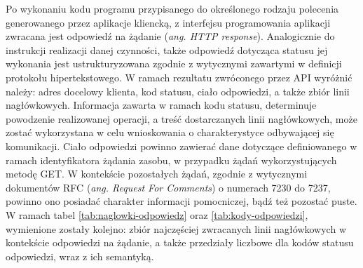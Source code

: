 Po wykonaniu kodu programu przypisanego do określonego rodzaju polecenia generowanego przez aplikacje kliencką, z interfejsu programowania aplikacji zwracana jest odpowiedź na żądanie (\textit{ang. HTTP response}). Analogicznie do instrukcji realizacji danej czynności, także odpowiedź dotycząca statusu jej wykonania jest ustrukturyzowana zgodnie z wytycznymi zawartymi w definicji protokołu hipertekstowego. W ramach rezultatu zwróconego przez API wyróżnić należy: adres docelowy klienta, kod statusu, ciało odpowiedzi, a także zbiór linii nagłówkowych. Informacja zawarta w ramach kodu statusu, determinuje powodzenie realizowanej operacji, a treść dostarczanych linii nagłówkowych, może zostać wykorzystana w celu wnioskowania o charakterystyce odbywającej się komunikacji. Ciało odpowiedzi powinno zawierać dane dotyczące definiowanego w ramach identyfikatora żądania zasobu, w przypadku żądań wykorzystujących metodę GET. W kontekście pozostałych żądań, zgodnie z wytycznymi dokumentów RFC (\textit{ang. Request For Comments}) o numerach 7230 do 7237, powinno ono posiadać charakter informacji pomocniczej, bądź też pozostać puste. W ramach tabel \ref{tab:naglowki-odpowiedz} oraz \ref{tab:kody-odpowiedzi}, wymienione zostały kolejno: zbiór najczęściej zwracanych linii nagłówkowych w kontekście odpowiedzi na żądanie, a także przedziały liczbowe dla kodów statusu odpowiedzi, wraz z ich semantyką.

